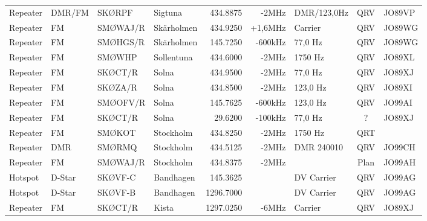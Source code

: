 \begin{landscape}
\begin{longtable}{llllrrlcl}
	Repeater           & DMR/FM       & SKØRPF        & Sigtuna      &          434.8875 &          -2MHz & DMR/123,0Hz     &       QRV       & JO89VP           \\
	Repeater           & FM           & SMØWAJ/R      & Skärholmen   &          434.9250 &        +1,6MHz & Carrier         &       QRV       & JO89WG           \\
	Repeater           & FM           & SMØHGS/R      & Skärholmen   &          145.7250 &        -600kHz & 77,0 Hz         &       QRV       & JO89WG           \\
	Repeater           & FM           & SMØWHP        & Sollentuna   &          434.6000 &          -2MHz & 1750 Hz         &       QRV       & JO89XL           \\
	Repeater           & FM           & SKØCT/R       & Solna        &          434.9500 &          -2MHz & 77,0 Hz         &       QRV       & JO89XJ           \\
	Repeater           & FM           & SKØZA/R       & Solna        &          434.8500 &          -2MHz & 123,0 Hz        &       QRV       & JO89XI           \\
	Repeater           & FM           & SMØOFV/R      & Solna        &          145.7625 &        -600kHz & 123,0 Hz        &       QRV       & JO99AI           \\
	Repeater           & FM           & SKØCT/R       & Solna        &           29.6200 &        -100kHz & 77,0 Hz         &        ?        & JO89XJ           \\
	Repeater           & FM           & SMØKOT        & Stockholm    &          434.8250 &          -2MHz & 1750 Hz         &       QRT       &  \\
	Repeater           & DMR          & SMØRMQ        & Stockholm    &          434.5125 &          -2MHz & DMR 240010      &       QRV       & JO99CH           \\
	Repeater           & FM           & SMØWAJ/R      & Stockholm    &          434.8375 &          -2MHz &                 &      Plan       & JO99AH           \\
	Hotspot            & D-Star       & SKØVF-C       & Bandhagen    &          145.3625 &                & DV Carrier      &       QRV       & JO99AG           \\
	Hotspot            & D-Star       & SKØVF-B       & Bandhagen    &         1296.7000 &                & DV Carrier      &       QRV       & JO99AG           \\
	Repeater           & FM           & SKØCT/R       & Kista        &         1297.0250 &          -6MHz & Carrier         &       QRV       & JO89XJ           \\

\end{longtable}
\end{landscape}
